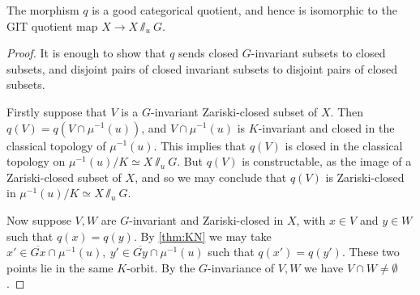 \begin{lemma}\label{lem:catquot}
The morphism \(q\) is a good categorical quotient, and hence is isomorphic to the GIT quotient map \(X \to X\sslash_u G\).
\end{lemma}
%
%
%
\begin{proof}
It is enough to show that \(q\) sends closed \(G\)-invariant subsets to closed subsets, and disjoint pairs of closed invariant subsets to disjoint pairs of closed subsets.

Firstly suppose that \(V\) is a  \(G\)-invariant Zariski-closed subset of \(X\). Then \(q(V) = q(V \cap \mu^{-1}(u))\), and \(V \cap \mu^{-1}(u)\) is \(K\)-invariant and closed in the classical topology of \(\mu^{-1}(u)\). This implies that \(q(V)\) is closed in the classical topology on \(\mu^{-1}(u)/K \simeq X\sslash_u G\). But \(q(V)\) is constructable, as the image of a Zariski-closed subset of \(X\), and so we may conclude that \(q(V)\) is Zariski-closed in \(\mu^{-1}(u)/K \simeq X\sslash_u G\).

Now suppose \(V,W\) are \(G\)-invariant and Zariski-closed in \(X\), with \(x \in V\) and \(y \in W\) such that \(q(x) = q(y)\). By \ref{thm:KN} we may take \({x'} \in \overline{Gx} \cap \mu^{-1}(u), \ {y'} \in \overline{Gy} \cap \mu^{-1}(u)\) such that \(q({x'}) = q({y'})\). These two points lie in the same \(K\)-orbit. By the \(G\)-invariance of \(V,W\) we have \(V \cap W \neq \emptyset\).
\end{proof}
%
%
%
%
%
%
